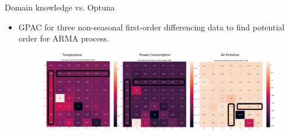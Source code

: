 \documentclass[aspectratio=16 9,10pt]{beamer}
\begin{document}
\begin{frame}{Domain knowledge vs. Optuna}
\begin{itemize}
\item GPAC for three non-seasonal first-order differencing data to find potential order for ARMA process.
\begin{figure}
	\begin{center}
		\includegraphics[scale=0.6]{gpac2.pdf}
	\end{center}
	\label{fig:gpac1}
\end{figure}
\end{itemize}
\end{frame}
\end{document}
